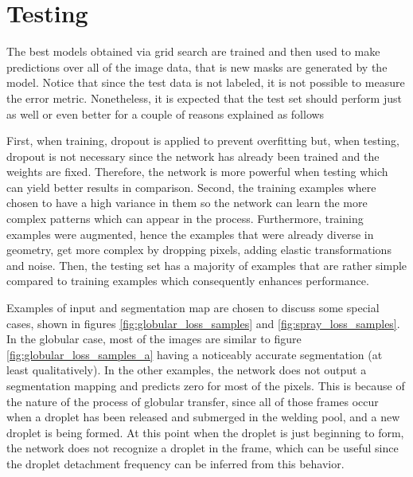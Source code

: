 \section{Testing}

The best models obtained via grid search are trained and then used to make predictions over all of the image data, that is new masks are generated by the model. Notice that since the test data is not labeled, it is not possible to measure the error metric. Nonetheless, it is expected that the test set should perform just as well or even better for a couple of reasons explained as follows

First, when training, dropout is applied to prevent overfitting but, when testing, dropout is not necessary since the network has already been trained and the weights are fixed. Therefore, the network is more powerful when testing which can yield better results in comparison. Second, the training examples where chosen to have a high variance in them so the network can learn the more complex patterns which can appear in the process. Furthermore, training examples were augmented, hence the examples that were already diverse in geometry, get more complex by dropping pixels, adding elastic transformations and noise.
Then, the testing set has a majority of examples that are rather simple compared to training examples which consequently enhances performance. 

Examples of input and segmentation map are chosen to discuss some special cases, shown in figures \ref{fig:globular_loss_samples} and \ref{fig:spray_loss_samples}. In the globular case, most of the images are similar to figure \ref{fig:globular_loss_samples_a} having a noticeably accurate segmentation (at least qualitatively). In the other examples, the network does not output a segmentation mapping and predicts zero for most of the pixels. This is because of the nature of the process of globular transfer, since all of those frames occur when a droplet has been released and submerged in the welding pool, and a new droplet is being formed. At this point when the droplet is just beginning to form, the network does not recognize a droplet in the frame, which can be useful since the droplet detachment frequency can be inferred from this behavior.

